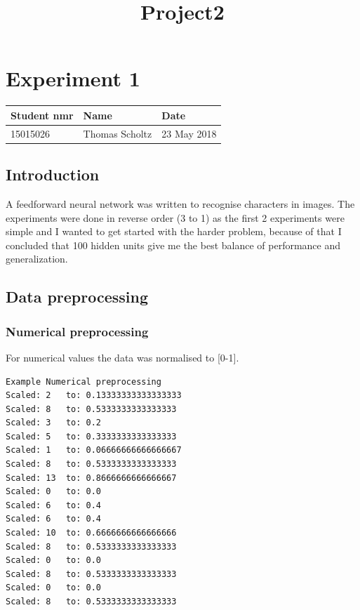 \documentclass[11pt]{article}
\title{Project2}
\begin{document}
    
    
    \maketitle
    
    

    
    \hypertarget{experiment-1}{%
\section{Experiment 1}\label{experiment-1}}

\begin{longtable}[]{@{}lll@{}}
\toprule
Student nmr & Name & Date\tabularnewline
\midrule
\endhead
15015026 & Thomas Scholtz & 23 May 2018\tabularnewline
\bottomrule
\end{longtable}

\hypertarget{introduction}{%
\subsection{Introduction}\label{introduction}}

A feedforward neural network was written to recognise characters in
images. The experiments were done in reverse order (3 to 1) as the first
2 experiments were simple and I wanted to get started with the harder
problem, because of that I concluded that 100 hidden units give me the
best balance of performance and generalization.

    \hypertarget{data-preprocessing}{%
\subsection{Data preprocessing}\label{data-preprocessing}}

\hypertarget{numerical-preprocessing}{%
\subsubsection{Numerical preprocessing}\label{numerical-preprocessing}}

For numerical values the data was normalised to {[}0-1{]}.

\begin{verbatim}
Example Numerical preprocessing
Scaled: 2   to: 0.13333333333333333
Scaled: 8   to: 0.5333333333333333
Scaled: 3   to: 0.2
Scaled: 5   to: 0.3333333333333333
Scaled: 1   to: 0.06666666666666667
Scaled: 8   to: 0.5333333333333333
Scaled: 13  to: 0.8666666666666667
Scaled: 0   to: 0.0
Scaled: 6   to: 0.4
Scaled: 6   to: 0.4
Scaled: 10  to: 0.6666666666666666
Scaled: 8   to: 0.5333333333333333
Scaled: 0   to: 0.0
Scaled: 8   to: 0.5333333333333333
Scaled: 0   to: 0.0
Scaled: 8   to: 0.5333333333333333
\end{verbatim}
\end{document}
